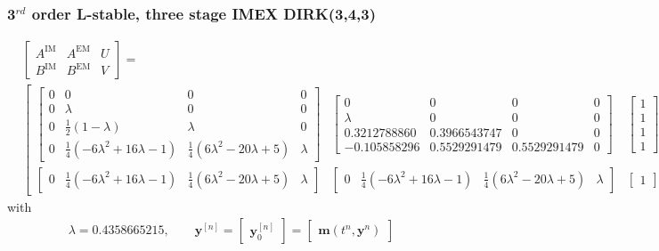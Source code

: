 \subsubsection{3$^{rd}$ order L-stable, three stage IMEX DIRK(3,4,3)}
\tiny
\begin{align*}
  &\left[\begin{array}{cc|c}
  A^{\mathrm{IM}} & A^{\mathrm{EM}} & U \\
  \hline
  B^{\mathrm{IM}} & B^{\mathrm{EM}} & V
  \end{array}\right] =\\
  &\left[\begin{array}{cc|c}
  \left[\begin{array}{cccc}
  0 & 0 & 0 & 0 \\
  0 & \lambda & 0 & 0 \\
  0 & \frac{1}{2}\left(1-\lambda\right) & \lambda & 0 \\
  0 & \frac{1}{4}\left(-6\lambda^2+16\lambda-1\right) & \frac{1}{4}\left(6\lambda^2-20\lambda+5\right) & \lambda
  \end{array}\right] &
  \left[\begin{array}{cccc}
  0 & 0 & 0 & 0 \\
  \lambda & 0 & 0 & 0 \\
  0.3212788860 & 0.3966543747 & 0 & 0 \\
  -0.105858296 & 0.5529291479 & 0.5529291479 & 0
  \end{array}\right] &
  \left[\begin{array}{c}
  1\\
  1\\
  1\\
  1
  \end{array}\right] \\
  \hline
  \left[\begin{array}{cccc}
  0 & \frac{1}{4}\left(-6\lambda^2+16\lambda-1\right) & \frac{1}{4}\left(6\lambda^2-20\lambda+5\right) & \lambda
  \end{array}\right] &
  \left[\begin{array}{cccc}
  0 & \frac{1}{4}\left(-6\lambda^2+16\lambda-1\right) & \frac{1}{4}\left(6\lambda^2-20\lambda+5\right) & \lambda
  \end{array}\right] &
  \left[\begin{array}{c}
  1
  \end{array}\right]
  \end{array}\right]
\end{align*}
\normalsize
with
\begin{align*}
  \lambda=0.4358665215,\qquad
  \boldsymbol{y}^{[n]}=
  \left[\begin{array}{c}
  \boldsymbol{y}^{[n]}_0
  \end{array}\right]=
  \left[\begin{array}{c}
  \boldsymbol{m}\left(t^n,\boldsymbol{y}^{n}\right)
  \end{array}\right]
\end{align*}


